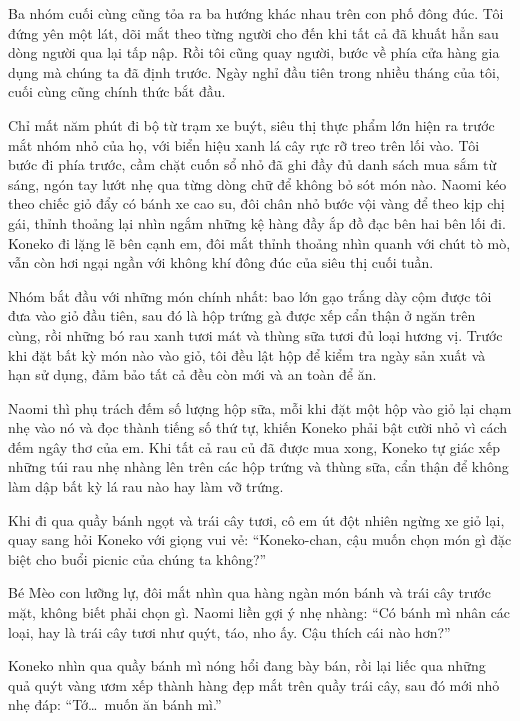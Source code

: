 ﻿\documentclass[../main.tex]{subfiles}
\begin{document}
Ba nhóm cuối cùng cũng tỏa ra ba hướng khác nhau trên con phố đông đúc. Tôi đứng yên một lát, dõi mắt theo từng người cho đến khi tất cả đã khuất hẳn sau dòng người qua lại tấp nập. Rồi tôi cũng quay người, bước về phía cửa hàng gia dụng mà chúng ta đã định trước. Ngày nghỉ đầu tiên trong nhiều tháng của tôi, cuối cùng cũng chính thức bắt đầu.

\ct


Chỉ mất năm phút đi bộ từ trạm xe buýt, siêu thị thực phẩm lớn hiện ra trước mắt nhóm nhỏ của họ, với biển hiệu xanh lá cây rực rỡ treo trên lối vào. Tôi bước đi phía trước, cầm chặt cuốn sổ nhỏ đã ghi đầy đủ danh sách mua sắm từ sáng, ngón tay lướt nhẹ qua từng dòng chữ để không bỏ sót món nào. Naomi kéo theo chiếc giỏ đẩy có bánh xe cao su, đôi chân nhỏ bước vội vàng để theo kịp chị gái, thỉnh thoảng lại nhìn ngắm những kệ hàng đầy ắp đồ đạc bên hai bên lối đi. Koneko đi lặng lẽ bên cạnh em, đôi mắt thỉnh thoảng nhìn quanh với chút tò mò, vẫn còn hơi ngại ngần với không khí đông đúc của siêu thị cuối tuần.

Nhóm bắt đầu với những món chính nhất: bao lớn gạo trắng dày cộm được tôi đưa vào giỏ đầu tiên, sau đó là hộp trứng gà được xếp cẩn thận ở ngăn trên cùng, rồi những bó rau xanh tươi mát và thùng sữa tươi đủ loại hương vị. Trước khi đặt bất kỳ món nào vào giỏ, tôi đều lật hộp để kiểm tra ngày sản xuất và hạn sử dụng, đảm bảo tất cả đều còn mới và an toàn để ăn.

Naomi thì phụ trách đếm số lượng hộp sữa, mỗi khi đặt một hộp vào giỏ lại chạm nhẹ vào nó và đọc thành tiếng số thứ tự, khiến Koneko phải bật cười nhỏ vì cách đếm ngây thơ của em. Khi tất cả rau củ đã được mua xong, Koneko tự giác xếp những túi rau nhẹ nhàng lên trên các hộp trứng và thùng sữa, cẩn thận để không làm dập bất kỳ lá rau nào hay làm vỡ trứng.

Khi đi qua quầy bánh ngọt và trái cây tươi, cô em út đột nhiên ngừng xe giỏ lại, quay sang hỏi Koneko với giọng vui vẻ: ``Koneko-chan, cậu muốn chọn món gì đặc biệt cho buổi picnic của chúng ta không?''

Bé Mèo con lưỡng lự, đôi mắt nhìn qua hàng ngàn món bánh và trái cây trước mặt, không biết phải chọn gì. Naomi liền gợi ý nhẹ nhàng: ``Có bánh mì nhân các loại, hay là trái cây tươi như quýt, táo, nho ấy. Cậu thích cái nào hơn?''

Koneko nhìn qua quầy bánh mì nóng hổi đang bày bán, rồi lại liếc qua những quả quýt vàng ươm xếp thành hàng đẹp mắt trên quầy trái cây, sau đó mới nhỏ nhẹ đáp: ``Tớ\dots\ muốn ăn bánh mì.''
\end{document}
